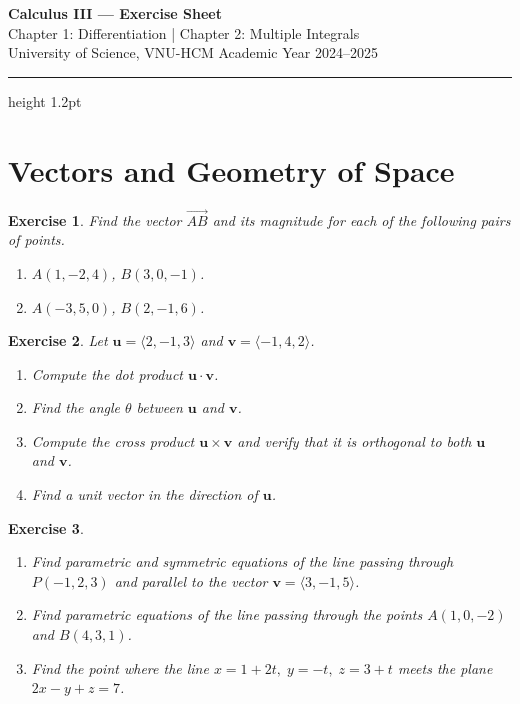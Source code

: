 \documentclass[12pt,a4paper]{article}
\theoremstyle{exercise}
\newtheorem{exercise}{Exercise}[section]
\theoremstyle{hint}
\begin{document}
\begin{center}
  {\LARGE\bfseries\color{primary} Calculus III --- Exercise Sheet}\\[4pt]
  {\large\color{secondary} Chapter 1: Differentiation \quad|\quad
   Chapter 2: Multiple Integrals}\\[4pt]
  {\normalsize University of Science, VNU-HCM \hfill
   Academic Year 2024--2025}
\end{center}
\vspace{-4pt}
\hrule height 1.2pt
\vspace{12pt}

\tableofcontents
\newpage

\section{Vectors and Geometry of Space}

\begin{exercise}
Find the vector $\overrightarrow{AB}$ and its magnitude for each of the
following pairs of points.
\begin{enumerate}[label=(\alph*)]
  \item $A(1,-2,4)$, $B(3,0,-1)$.
  \item $A(-3,5,0)$, $B(2,-1,6)$.
\end{enumerate}
\end{exercise}

\begin{exercise}
Let $\mathbf{u}=\langle 2,-1,3\rangle$ and
$\mathbf{v}=\langle -1,4,2\rangle$.
\begin{enumerate}[label=(\alph*)]
  \item Compute the dot product $\mathbf{u}\cdot\mathbf{v}$.
  \item Find the angle $\theta$ between $\mathbf{u}$ and $\mathbf{v}$.
  \item Compute the cross product $\mathbf{u}\times\mathbf{v}$ and verify
        that it is orthogonal to both $\mathbf{u}$ and $\mathbf{v}$.
  \item Find a unit vector in the direction of $\mathbf{u}$.
\end{enumerate}
\end{exercise}

\begin{exercise}
\begin{enumerate}[label=(\alph*)]
  \item Find parametric and symmetric equations of the line passing
        through $P(-1,2,3)$ and parallel to the vector
        $\mathbf{v}=\langle 3,-1,5\rangle$.
  \item Find parametric equations of the line passing through the points
        $A(1,0,-2)$ and $B(4,3,1)$.
  \item Find the point where the line $x=1+2t,\;y=-t,\;z=3+t$ meets
        the plane $2x-y+z=7$.
\end{enumerate}
\end{exercise}
\end{document}
